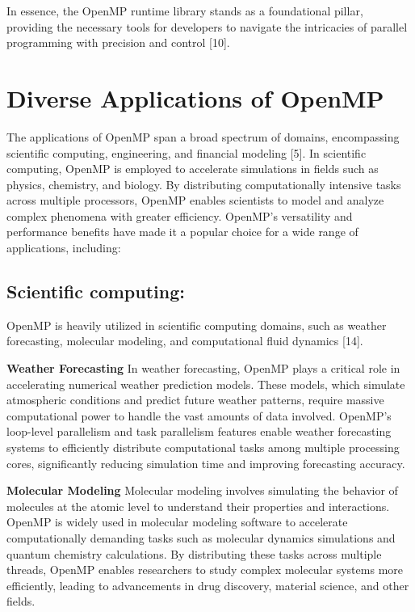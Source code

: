 \documentclass[12pt,conference]{IEEEtran}
\begin{document}
In essence, the OpenMP runtime library stands as a foundational pillar, providing the necessary tools for developers to navigate the intricacies of parallel programming with precision and control [10].

\section{Diverse Applications of OpenMP}
The applications of OpenMP span a broad spectrum of domains, encompassing scientific computing, engineering, and financial modeling [5]. In scientific computing, OpenMP is employed to accelerate simulations in fields such as physics, chemistry, and biology. By distributing computationally intensive tasks across multiple processors, OpenMP enables scientists to model and analyze complex phenomena with greater efficiency. OpenMP's versatility and performance benefits have made it a popular choice for a wide range of applications, including:

\subsection{Scientific computing:} OpenMP is heavily utilized in scientific computing domains, such as weather forecasting, molecular modeling, and computational fluid dynamics [14]. 


\textbf{Weather Forecasting} In weather forecasting, OpenMP plays a critical role in accelerating numerical weather prediction models. These models, which simulate atmospheric conditions and predict future weather patterns, require massive computational power to handle the vast amounts of data involved. OpenMP's loop-level parallelism and task parallelism features enable weather forecasting systems to efficiently distribute computational tasks among multiple processing cores, significantly reducing simulation time and improving forecasting accuracy.

\textbf{Molecular Modeling} Molecular modeling involves simulating the behavior of molecules at the atomic level to understand their properties and interactions. OpenMP is widely used in molecular modeling software to accelerate computationally demanding tasks such as molecular dynamics simulations and quantum chemistry calculations. By distributing these tasks across multiple threads, OpenMP enables researchers to study complex molecular systems more efficiently, leading to advancements in drug discovery, material science, and other fields.
\end{document}
